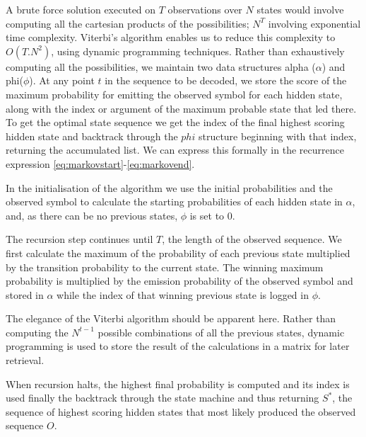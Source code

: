 {{{{{{{A brute force solution executed on $T$ observations over $N$ states would involve computing all the cartesian products of the possibilities; $N^T$ involving exponential time complexity. Viterbi’s algorithm enables us to reduce this complexity to $O(T.N^2)$, using dynamic programming techniques. Rather than exhaustively computing all the possibilities, we maintain two data structures alpha ($\alpha$) and phi($\phi$). At any point $t$ in the sequence to be decoded, we store the score of the maximum probability for emitting the observed symbol for each hidden state, along with the index or argument of the maximum probable state that led there. To get the optimal state sequence we get the index of the final highest scoring hidden state and backtrack through the $phi$ structure beginning with that index, returning the accumulated list. We can express this formally in the recurrence expression \ref{eq:markovstart}-\ref{eq:markovend}.

In the initialisation of the algorithm we use the initial probabilities and the observed symbol to calculate the starting probabilities of each hidden state in $\alpha$, and, as there can be no previous states, $\phi$ is set to 0.

The recursion step continues until $T$, the length of the observed sequence. We first calculate the maximum of the probability of each previous state multiplied by the transition probability to the current state. The winning maximum probability is multiplied by the emission probability of the observed symbol and stored in $\alpha$ while the index of that winning previous state is logged in $\phi$. 

The elegance of the Viterbi algorithm should be apparent here. Rather than computing the $N^{t-1}$ possible combinations of all the previous states, dynamic programming is used to store the result of the calculations in a matrix for later retrieval. 

When recursion halts, the highest final probability is computed and its index is used finally the backtrack through the state machine and thus returning $S^*$, the sequence of highest scoring hidden states that most likely produced the observed sequence $O$.


\setlength{\parindent}{1cm}

}}}}}}}
